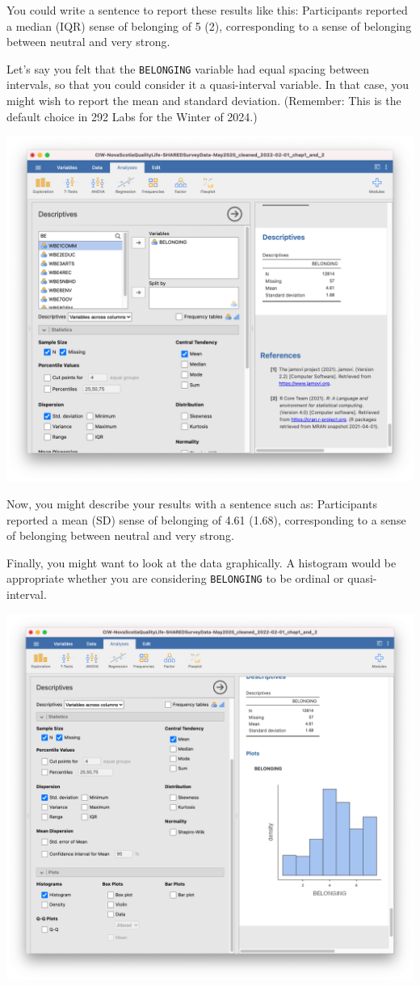 \documentclass[
]{book}
\begin{document}
You could write a sentence to report these results like this: Participants reported a median (IQR) sense of belonging of 5 (2), corresponding to a sense of belonging between neutral and very strong.

Let's say you felt that the \texttt{BELONGING} variable had equal spacing between intervals, so that you could consider it a quasi-interval variable. In that case, you might wish to report the mean and standard deviation. (Remember: This is the default choice in 292 Labs for the Winter of 2024.)

\includegraphics{img/belongingquasioutput.png}

Now, you might describe your results with a sentence such as: Participants reported a mean (SD) sense of belonging of 4.61 (1.68), corresponding to a sense of belonging between neutral and very strong.

Finally, you might want to look at the data graphically. A histogram would be appropriate whether you are considering \texttt{BELONGING} to be ordinal or quasi-interval.

\includegraphics{img/belonginghistogram.png}
\end{document}
